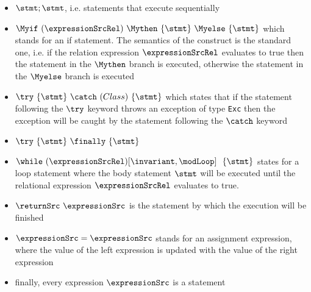 \begin{itemize}
   \item $\stmt;\stmt$, i.e. statements that execute sequentially 

   \item $\Myif \ (\expressionSrcRel) \ \Mythen \ \{ \stmt \} \  \Myelse \ \{ \stmt \}  $ which stands for
         an if statement. The semantics of the construct is the standard one, i.e. if the relation expression $\expressionSrcRel$ 
	 evaluates to true then the statement in the $ \Mythen$ branch is executed, otherwise the statement in the
	 $ \Myelse$ branch is executed

   \item $ \try  \ \{ \stmt \}  \ \catch \ ( Class  )\ \{ \stmt \}  $ which states that if the
            statement following the $ \try $ keyword throws an exception of type \texttt{Exc} then
	    the exception will be caught by the statement following the  $ \catch $ keyword
	        
   \item  $ \try  \ \{ \stmt \} \ \finally \ \{ \stmt \} $ 
   \item $ \while \ (\expressionSrcRel) \lbrack \invariant, \modLoop \rbrack \ \do \ \{ \stmt \} $ states for a loop statement where the body statement
         $ \stmt$ will be executed until the relational expression  $\expressionSrcRel$ evaluates to true.
   \item  $ \returnSrc \  \expressionSrc $ is the statement by which the execution will be finished
   \item $ \expressionSrc = \expressionSrc$ stands for an assignment expression, where the value of the left expression is updated with the value   
         of the right expression  
    \item finally, every expression $\expressionSrc$ is a statement 
 
\end{itemize}
